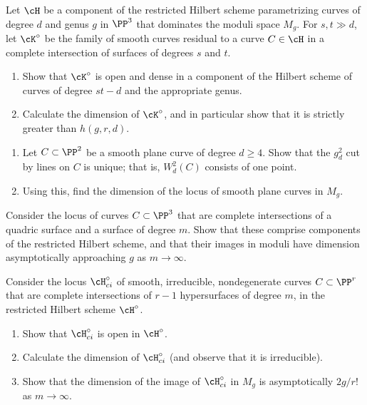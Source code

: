 \begin{exercise}\label{many large components}
Let $\cH$ be a component of the restricted Hilbert scheme param\-etrizing
curves of degree $d$ and genus $g$ in $\PP^3$ that dominates the moduli
space $M_g$. For $s, t \gg d$, let $\cK^\circ$ be the family of smooth
curves residual to a curve $C \in  \cH$ in a complete intersection of
surfaces of degrees $s$ and $t$.
\begin{enumerate}
\item Show that $\cK^\circ$ is open and dense in a component of the
Hilbert scheme of curves of degree $st-d$ and the appropriate genus.
\item Calculate the dimension of $\cK^\circ$, and in particular show
that it is strictly greater than $h(g,r,d)$.
\end{enumerate}
\end{exercise}

\begin{exercise}\label{moduli of plane curves}
\begin{enumerate}
\item Let $C \subset \PP^2$ be a smooth plane curve of degree $d\geq
4$. Show that the $g^2_d$ cut by lines on $C$ is unique; that is,
$W^2_d(C)$ consists of one point.
\item Using this, find the dimension of the locus of smooth plane curves
in $M_g$.
\end{enumerate}\label{tnih19.21}
\end{exercise}

\begin{exercise}\label{balanced ci}
Consider the locus of curves $C \subset \PP^3$ that are complete
intersections of a quadric surface and a surface of degree $m$. Show
that these comprise components of the restricted Hilbert scheme, and
that their images in moduli have dimension asymptotically approaching $g$
as $m \to \infty$.
\end{exercise}

\begin{exercise}\label{balanced CI in higher codim}
Consider the locus $\cH^\circ_{ci}$ of smooth, irreducible, nondegenerate
curves $C \subset \PP^r$ that are complete intersections of $r-1$
hypersurfaces of degree $m$, in the restricted Hilbert scheme $\cH^\circ$.
%
\begin{enumerate}
\item Show that $\cH^\circ_{ci}$ is open in $\cH^\circ$.
\item Calculate the dimension of $\cH^\circ_{ci}$ (and observe that it
is irreducible).
\item Show that the dimension of the image of $\cH^\circ_{ci}$ in $M_g$
is asymptotically $2g/r!$ as $m \to \infty$.
%
\end{enumerate}
\end{exercise}


